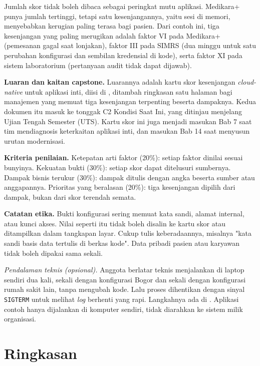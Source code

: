 Jumlah skor tidak boleh dibaca sebagai peringkat mutu aplikasi. Medikara+ punya jumlah
tertinggi, tetapi satu kesenjangannya, yaitu sesi di memori, menyebabkan kerugian paling
terasa bagi pasien. Dari contoh ini, tiga kesenjangan yang paling merugikan adalah faktor VI
pada Medikara+ (pemesanan gagal saat lonjakan), faktor III pada SIMRS (dua minggu untuk satu
perubahan konfigurasi dan sembilan kredensial di kode), serta faktor XI pada sistem
laboratorium (pertanyaan audit tidak dapat dijawab).

\textbf{Luaran dan kaitan capstone.} Luarannya adalah kartu skor kesenjangan
\textit{cloud-native} untuk aplikasi inti, diisi di
, ditambah ringkasan satu halaman
bagi manajemen yang memuat tiga kesenjangan terpenting beserta dampaknya. Kedua dokumen itu
masuk ke tonggak C2 Kondisi Saat Ini, yang ditinjau menjelang Ujian Tengah Semester (UTS).
Kartu skor ini juga menjadi masukan Bab 7 saat tim mendiagnosis keterkaitan aplikasi inti,
dan masukan Bab 14 saat menyusun urutan modernisasi.

\textbf{Kriteria penilaian.} Ketepatan arti faktor (20\%): setiap faktor dinilai sesuai
bunyinya. Kekuatan bukti (30\%): setiap skor dapat ditelusuri sumbernya. Dampak bisnis
terukur (30\%): dampak ditulis dengan angka beserta sumber atau anggapannya. Prioritas yang
beralasan (20\%): tiga kesenjangan dipilih dari dampak, bukan dari skor terendah semata.

\textbf{Catatan etika.} Bukti konfigurasi sering memuat kata sandi, alamat internal, atau
kunci akses. Nilai seperti itu tidak boleh disalin ke kartu skor atau ditampilkan dalam
tangkapan layar. Cukup tulis keberadaannya, misalnya "kata sandi basis data tertulis di
berkas kode". Data pribadi pasien atau karyawan tidak boleh dipakai sama sekali.

\textit{Pendalaman teknis (opsional).} Anggota berlatar teknis menjalankan
 di laptop sendiri dua kali,
sekali dengan konfigurasi Bogor dan sekali dengan konfigurasi rumah sakit lain, tanpa
mengubah kode. Lalu proses dihentikan dengan sinyal \texttt{SIGTERM} untuk melihat
\textit{log} berhenti yang rapi. Langkahnya ada di .
Aplikasi contoh hanya dijalankan di komputer sendiri, tidak diarahkan ke sistem milik
organisasi.

\section{Ringkasan}

